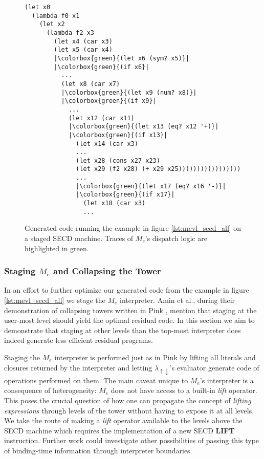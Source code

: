\documentclass[a4paper,12pt,twoside,openright]{report}
\theoremstyle{definition}
\newcommand{\mslang}{$\lambda_{\uparrow\downarrow}$}
\newcommand{\mevl}{$M_{e}$}
\begin{document}
\begin{figure}[htp!]
\centering
    \begin{verbatim}
(let x0
  (lambda f0 x1
    (let x2
      (lambda f2 x3
        (let x4 (car x3)
        (let x5 (car x4)
        |\colorbox{green}{(let x6 (sym? x5)}|
        |\colorbox{green}{(if x6}|
          ...
          (let x8 (car x7)
          |\colorbox{green}{(let x9 (num? x8)}|
          |\colorbox{green}{(if x9}|
            ...
            (let x12 (car x11)
            |\colorbox{green}{(let x13 (eq? x12 '+)}|
            |\colorbox{green}{(if x13}|
              (let x14 (car x3)
              ...
              (let x28 (cons x27 x23)
              (let x29 (f2 x28) (+ x29 x25)))))))))))))))))
              ...
              |\colorbox{green}{(let x17 (eq? x16 '-)}|
              |\colorbox{green}{(if x17}|
                (let x18 (car x3)
                ...
    \end{verbatim}
\caption{Generated code running the example in figure \ref{lst:mevl_secd_all} on a staged SECD machine. Traces of \mevl's dispatch logic are highlighted in green.}
\label{lst:mevl_secd_ped}
\end{figure}
\newpage

\subsubsection{Staging \texorpdfstring{\mevl}{Lg} and Collapsing the Tower}\label{ssubsec:mevl_staged}
In an effort to further optimize our generated code from the example in figure \ref{lst:mevl_secd_all} we stage the \mevl{} interpreter. Amin et al., during their demonstration of collapsing towers written in Pink \cite{amin2017collapsing}, mention that staging at the user-most level should yield the optimal residual code. In this section we aim to demonstrate that staging at other levels than the top-most interpreter does indeed generate less efficient residual programs.

Staging the \mevl{} interpreter is performed just as in Pink by lifting all literals and closures returned by the interpreter and letting \mslang's evaluator generate code of operations performed on them. The main caveat unique to \mevl's interpreter is a consequence of heterogeneity: \mevl{} does not have access to a built-in \textit{lift} operator. This poses the crucial question of how one can propagate the concept of \textit{lifting expressions} through levels of the tower without having to expose it at all levels. We take the route of making a \textit{lift} operator available to the levels above the SECD machine which requires the implementation of a new SECD \textbf{LIFT} instruction. Further work could investigate other possibilities of passing this type of binding-time information through interpreter boundaries.
\end{document}

